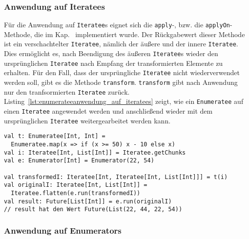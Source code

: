 

\subsubsection{Anwendung auf Iteratees} %
\label{ssub:enumerateeanwendung_auf_iteratees}

Für die Anwendung auf \lstinline|Iteratee|s eignet sich die \lstinline|apply|-, bzw. die \lstinline|applyOn|-Methode, die im Kap.~ implementiert wurde.
Der Rückgabewert dieser Methode ist ein verschachtelter \lstinline|Iteratee|, nämlich der äußere und der innere \lstinline|Iteratee|.
Dies ermöglicht es, nach Beendigung des äußeren \lstinline|Iteratee|s wieder den ursprünglichen \lstinline|Iteratee| nach Empfang der transformierten Elemente zu erhalten.
Für den Fall, dass der ursprüngliche \lstinline|Iteratee| nicht wiederverwendet werden soll, gibt es die Methode \lstinline|transform|.
\lstinline|transform| gibt nach Anwendung nur den tranfsormierten \lstinline|Iteratee| zurück.
Listing~\ref{lst:enumerateeanwendung_auf_iteratees} zeigt, wie ein \lstinline|Enumeratee| auf einen \lstinline|Iteratee| angewendet werden und anschließend wieder mit dem ursprünglichen \lstinline|Iteratee| weitergearbeitet werden kann.

\begin{lstlisting}[caption=Enumerateeanwendung auf Iteratees, label=lst:enumerateeanwendung_auf_iteratees]
val t: Enumeratee[Int, Int] =
  Enumeratee.map(x => if (x >= 50) x - 10 else x)
val i: Iteratee[Int, List[Int]] = Iteratee.getChunks
val e: Enumerator[Int] = Enumerator(22, 54)

val transformedI: Iteratee[Int, Iteratee[Int, List[Int]]] = t(i)
val originalI: Iteratee[Int, List[Int]] =
  Iteratee.flatten(e.run(transformedI))
val result: Future[List[Int]] = e.run(originalI)
// result hat den Wert Future(List(22, 44, 22, 54))
\end{lstlisting}


\subsubsection{Anwendung auf Enumerators} %
\label{ssub:enumerateeanwendung_auf_enumerators}

